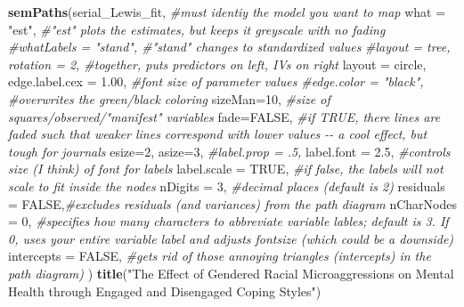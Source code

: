 \documentclass[
  11pt,
]{book}
\newenvironment{Shaded}{\begin{snugshade}}{\end{snugshade}}
\newcommand{\AttributeTok}[1]{\textcolor[rgb]{0.27,0.27,0.27}{#1}}
\newcommand{\CommentTok}[1]{\textcolor[rgb]{0.37,0.37,0.37}{\textit{#1}}}
\newcommand{\ConstantTok}[1]{\textcolor[rgb]{0.37,0.37,0.37}{#1}}
\newcommand{\DecValTok}[1]{\textcolor[rgb]{0.06,0.06,0.06}{#1}}
\newcommand{\FloatTok}[1]{\textcolor[rgb]{0.06,0.06,0.06}{#1}}
\newcommand{\FunctionTok}[1]{\textcolor[rgb]{0.27,0.27,0.27}{\textbf{#1}}}
\newcommand{\NormalTok}[1]{#1}
\newcommand{\StringTok}[1]{\textcolor[rgb]{0.5,0.5,0.5}{#1}}
\begin{document}
\begin{Shaded}
\begin{Highlighting}[]
\FunctionTok{semPaths}\NormalTok{(serial\_Lewis\_fit, }\CommentTok{\#must identiy the model you want to map}
         \AttributeTok{what =} \StringTok{"est"}\NormalTok{, }\CommentTok{\#"est" plots the estimates, but keeps it greyscale with no fading}
         \CommentTok{\#whatLabels = "stand", \#"stand" changes to standardized values}
         \CommentTok{\#layout = \textquotesingle{}tree\textquotesingle{}, rotation = 2, \#together, puts predictors on left, IVs on right }
         \AttributeTok{layout =} \StringTok{\textquotesingle{}circle\textquotesingle{}}\NormalTok{,}
         \AttributeTok{edge.label.cex =} \FloatTok{1.00}\NormalTok{, }\CommentTok{\#font size of parameter values}
         \CommentTok{\#edge.color = "black", \#overwrites the green/black coloring}
         \AttributeTok{sizeMan=}\DecValTok{10}\NormalTok{, }\CommentTok{\#size of squares/observed/"manifest" variables}
         \AttributeTok{fade=}\ConstantTok{FALSE}\NormalTok{, }\CommentTok{\#if TRUE, there lines are faded such that weaker lines correspond with lower values {-}{-} a cool effect, but tough for journals}
         \AttributeTok{esize=}\DecValTok{2}\NormalTok{, }
         \AttributeTok{asize=}\DecValTok{3}\NormalTok{,}
         \CommentTok{\#label.prop = .5,}
         \AttributeTok{label.font =} \FloatTok{2.5}\NormalTok{, }\CommentTok{\#controls size (I think) of font for labels}
         \AttributeTok{label.scale =} \ConstantTok{TRUE}\NormalTok{, }\CommentTok{\#if false, the labels will not scale to fit inside the nodes}
         \AttributeTok{nDigits =} \DecValTok{3}\NormalTok{, }\CommentTok{\#decimal places (default is 2)}
         \AttributeTok{residuals =} \ConstantTok{FALSE}\NormalTok{,}\CommentTok{\#excludes residuals (and variances) from the path diagram}
         \AttributeTok{nCharNodes =} \DecValTok{0}\NormalTok{, }\CommentTok{\#specifies how many characters to abbreviate variable lables; default is 3.  If 0, uses your entire variable label and adjusts fontsize (which could be a downside)}
         \AttributeTok{intercepts =} \ConstantTok{FALSE}\NormalTok{, }\CommentTok{\#gets rid of those annoying triangles (intercepts) in the path diagram)}
\NormalTok{)}
\FunctionTok{title}\NormalTok{(}\StringTok{"The Effect of Gendered Racial Microaggressions on Mental Health through Engaged and Disengaged Coping Styles"}\NormalTok{)}
\end{Highlighting}
\end{Shaded}
\end{document}
